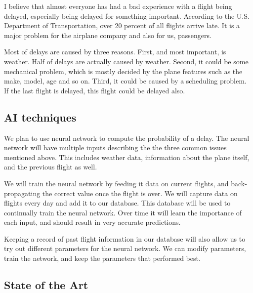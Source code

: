 \documentclass[12pt]{article}
\begin{document}
I believe that almost everyone has had a bad experience with a flight being 
delayed, especially being delayed for something important. According to the
U.S. Department of Transportation, over 20 percent of all flights arrive late.\cite{4732894} 
It is a major problem for the airplane company and also for us, passengers. 

Most of delays are caused by three reasons. First, and most important, is 
weather. Half of delays are actually caused by weather\cite{5655493}. Second, it could 
be some mechanical problem, which is mostly decided by the plane
features such as the make, model, age and so on. Third, it could be
caused by a scheduling problem. If the last flight is delayed, this flight 
could be delayed also. \cite{6891588}





\subsection{AI techniques}


We plan to use neural network to compute the probability of a delay. The neural
network will have multiple inputs describing the the three common issues
mentioned above. This includes weather data, information about the plane itself,
and the previous flight as well. 

We will train the neural network by feeding it data on current flights,
and back-propagating the correct value once the flight is over. We will capture
data on flights every day and add it to our database. This database will be used
to continually train the neural network. Over time it will learn the importance 
of each input, and should result in very accurate predictions.

Keeping a record of past flight information in our database will also allow us
to try out different parameters for the neural network. We can modify parameters,
train the network, and keep the parameters that performed best.

\subsection{State of the Art}

\end{document}
